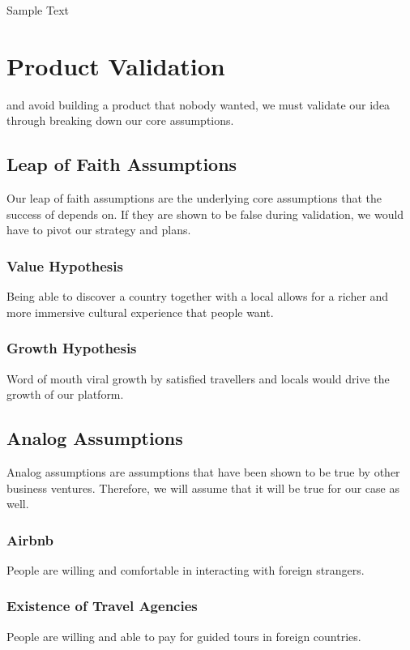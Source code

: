 \begin{savequote}[75mm] 
Sample Text
\end{savequote}

\chapter{Product Validation}

 and avoid building a product that nobody wanted, we must validate our idea through breaking down our core assumptions.

\section{Leap of Faith Assumptions}
Our leap of faith assumptions are the underlying core assumptions that the success of \name depends on. If they are shown to be false during validation, we would have to pivot our strategy and plans.

\subsection{Value Hypothesis}
Being able to discover a country together with a local allows for a richer and more immersive cultural experience that people want.

\subsection{Growth Hypothesis}
Word of mouth viral growth by satisfied travellers and locals would drive the growth of our platform.

\section{Analog Assumptions}
Analog assumptions are assumptions that have been shown to be true by other business ventures. Therefore, we will assume that it will be true for our case as well.

\subsection{Airbnb}
People are willing and comfortable in interacting with foreign strangers.

\subsection{Existence of Travel Agencies}
People are willing and able to pay for guided tours in foreign countries.

